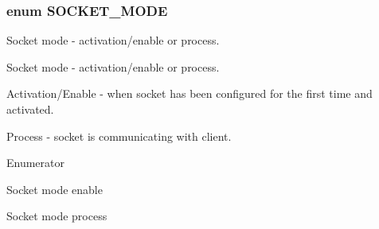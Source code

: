 \subsubsection[{\texorpdfstring{S\+O\+C\+K\+E\+T\+\_\+\+M\+O\+DE}{SOCKET_MODE}}]{\setlength{\rightskip}{0pt plus 5cm}enum {\bf S\+O\+C\+K\+E\+T\+\_\+\+M\+O\+DE}}\hypertarget{group__wireless__interface_ga2bd47c85b6411d92d82236c49fbaf567}{}\label{group__wireless__interface_ga2bd47c85b6411d92d82236c49fbaf567}


Socket mode -\/ activation/enable or process. 

Socket mode -\/ activation/enable or process.
\begin{DoxyItemize}
\item Activation/\+Enable -\/ when socket has been configured for the first time and activated.
\item Process -\/ socket is communicating with client. 
\end{DoxyItemize}\begin{Desc}
\item[Enumerator]\par
\begin{description}
\item[{\em 
S\+O\+C\+K\+E\+T\+\_\+\+M\+O\+D\+E\+\_\+\+E\+N\+A\+B\+LE\hypertarget{group__wireless__interface_gga2bd47c85b6411d92d82236c49fbaf567a27f9a7786e887936fa93893312821fe0}{}\label{group__wireless__interface_gga2bd47c85b6411d92d82236c49fbaf567a27f9a7786e887936fa93893312821fe0}
}]Socket mode enable \item[{\em 
S\+O\+C\+K\+E\+T\+\_\+\+M\+O\+D\+E\+\_\+\+P\+R\+O\+C\+E\+SS\hypertarget{group__wireless__interface_gga2bd47c85b6411d92d82236c49fbaf567a85c612afc4a587d9ccb67ca9ba78d20f}{}\label{group__wireless__interface_gga2bd47c85b6411d92d82236c49fbaf567a85c612afc4a587d9ccb67ca9ba78d20f}
}]Socket mode process \end{description}
\end{Desc}
